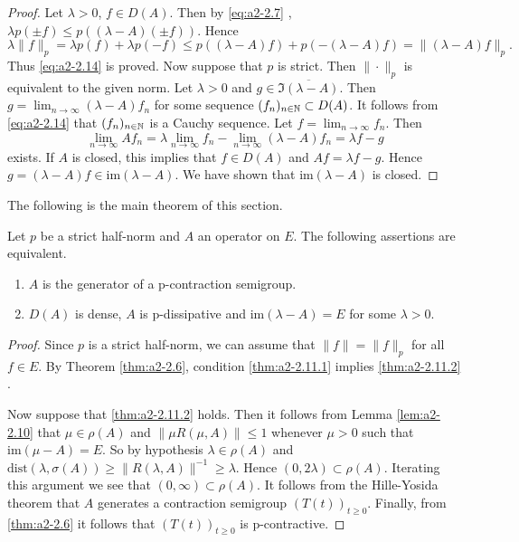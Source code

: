 \begin{proof}
Let $\lambda > 0$, $f \in D(A)$.
Then by \eqref{eq:a2-2.7}  
, $\lambda p(\pm f) \leq p((\lambda - A)(\pm f))$.
Hence 
\[
\lambda\|f\|_{p} = \lambda p(f) + \lambda p(-f) \leq p((\lambda - A)f) + p(-(\lambda-A)f) = \|(\lambda-A)f\|_{p}.
\]
Thus \eqref{eq:a2-2.14}   
is proved.
Now suppose that $p$ is strict.
Then $\|\cdot\|_{p}$ is equivalent to the given norm.
Let $\lambda > 0$ and $g \in \overline{\Im(\lambda - A)}$.
Then $g = \lim_{n\to\infty} (\lambda - A)f_{n}$ for some sequence $(f_{n})_{n \in \mathbb{N}} \subset D(A)$.
It follows from \eqref{eq:a2-2.14}  
that $(f_{n})_{n\in\mathbb{N}}$ is a Cauchy sequence.
Let $f = \lim_{n\to\infty} f_{n}$.
Then 
\[
\lim_{n\to\infty} Af_{n} 
= \lambda\lim_{n\to\infty} f_{n} - \lim_{n\to\infty} (\lambda - A)f_{n} = \lambda f - g
\]
exists.
If $A$ is closed, this implies that $f \in D(A)$ and $Af = \lambda f - g$.
Hence $g = (\lambda - A)f \in \text{im}(\lambda - A)$.
We have shown that $\text{im}(\lambda - A)$ is closed.
\end{proof}

The following is the main theorem of this section.

\begin{theorem}\label{thm:a2-2.11}
Let $p$ be a strict half-norm and $A$ an operator on $E$.
The following assertions are equivalent.
\begin{enumerate}[\upshape (a)]
\item \label{thm:a2-2.11.1}
$A$ is the generator of a p-contraction semigroup.
\item \label{thm:a2-2.11.2}
$D(A)$ is dense, $A$ is p-dissipative and $\text{im}(\lambda - A) = E$ for some $\lambda > 0$.
\end{enumerate}
\end{theorem}
\begin{proof}
Since $p$ is a strict half-norm, we can assume that $\|f\| = \|f\|_{p}$ for all $f \in E$.
By Theorem \ref{thm:a2-2.6}, condition \ref{thm:a2-2.11.1} implies \ref{thm:a2-2.11.2} . 

Now suppose that \ref{thm:a2-2.11.2}   holds.
Then it follows from Lemma \ref{lem:a2-2.10}   
that $\mu \in \rho(A)$ and $\|\mu R(\mu,A)\| \leq 1$ whenever $\mu > 0$ such that $\text{im}(\mu-A) = E$.
So by hypothesis $\lambda \in \rho(A)$ and 
$\text{dist}(\lambda,\sigma(A)) \geq \|R(\lambda,A)\|^{-1} \geq \lambda$.
Hence $(0,2\lambda) \subset \rho(A)$.
Iterating this argument we see that $(0,\infty) \subset \rho(A)$.
It follows from the Hille-Yosida theorem that $A$ generates a contraction semigroup $(T(t))_{t\geq 0}$.
Finally, from \ref{thm:a2-2.6} 
it follows that $(T(t))_{t\geq 0}$ is p-contractive.
\end{proof}

